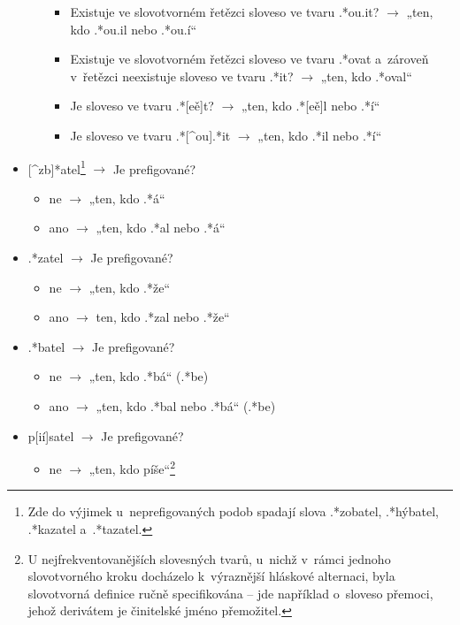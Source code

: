 \begin{itemize}
\begin{itemize}
    \begin{itemize}
    \tightlist
    \item
      Existuje ve slovotvorném řetězci sloveso ve tvaru .*ou.it?
      $\rightarrow$ „ten, kdo .*ou.il nebo .*ou.í``
    \item
      Existuje ve slovotvorném řetězci sloveso ve tvaru .*ovat a~zároveň
      v~řetězci neexistuje sloveso ve tvaru .*it? $\rightarrow$ „ten,
      kdo .*oval``
    \item
      Je sloveso ve tvaru .*{[}eě{]}t? $\rightarrow$ „ten, kdo
      .*{[}eě{]}l nebo .*í``
    \item
      Je sloveso ve tvaru .*{[}\^{}ou{]}.*it $\rightarrow$ „ten, kdo
      .*il nebo .*í``
    \end{itemize}
  \end{itemize}
\item
  {[}\^{}zb{]}*atel\footnote{Zde do výjimek u~neprefigovaných podob spadají slova .*zobatel, .*hýbatel, .*kazatel a~.*tazatel.}
  $\rightarrow$ Je prefigované?

  \begin{itemize}
  \tightlist
  \item
    ne $\rightarrow$ „ten, kdo .*á``
  \item
    ano $\rightarrow$ „ten, kdo .*al nebo .*á``
  \end{itemize}
\item
  .*zatel $\rightarrow$ Je prefigované?

  \begin{itemize}
  \tightlist
  \item
    ne $\rightarrow$ „ten, kdo .*že``
  \item
    ano $\rightarrow$ ten, kdo .*zal nebo .*že``
  \end{itemize}
\item
  .*batel $\rightarrow$ Je prefigované?

  \begin{itemize}
  \tightlist
  \item
    ne $\rightarrow$ „ten, kdo .*bá`` (.*be)
  \item
    ano $\rightarrow$ „ten, kdo .*bal nebo .*bá`` (.*be)
  \end{itemize}
\item
  p{[}ií{]}satel $\rightarrow$ Je prefigované?

  \begin{itemize}
  \tightlist
  \item
    ne $\rightarrow$ „ten, kdo
    píše``\footnote{U nejfrekventovanějších slovesných tvarů, u~nichž v~rámci jednoho slovotvorného kroku docházelo k~výraznější hláskové alternaci, byla slovotvorná definice ručně specifikována -- jde například o~sloveso přemoci, jehož derivátem je činitelské jméno přemožitel.}
  \end{itemize}
\end{itemize}

